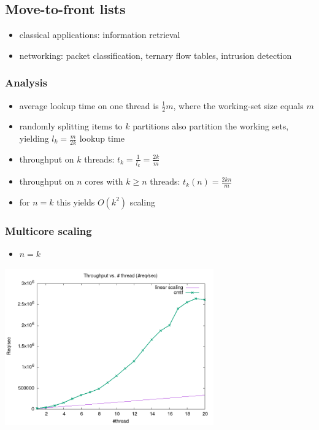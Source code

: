 \documentclass[11pt]{article}
\begin{document}
\subsection{Move-to-front lists}
\label{sec:org378fced}
\begin{itemize}
\item classical applications: information retrieval
\item networking: packet classification, ternary flow tables, intrusion detection
\end{itemize}

\subsubsection{Analysis}
\label{sec:orgb4914dd}
\begin{itemize}
\item average lookup time on one thread is \(\frac1{2}m\), where the working-set size equals \(m\)
\item randomly splitting items to \(k\) partitions also partition the working sets, yielding \(l_k =
  \frac{m}{2k}\) lookup time
\item throughput on \(k\) threads: \(t_k = \frac1{l_k} = \frac{2 k}{m}\)
\item throughput on \(n\) cores with \(k\ge n\) threads: \(t_k(n) = \frac{2k n}{m}\)
\item for \(n=k\) this yields \(O(k^2)\) scaling
\end{itemize}

\subsubsection{Multicore scaling}
\label{sec:orga8c51b3}
\begin{itemize}
\item \(n=k\)
\end{itemize}
\begin{center}
\includegraphics[width=9cm]{cmtf-no-cpu-bound.png}
\end{center}
\end{document}
